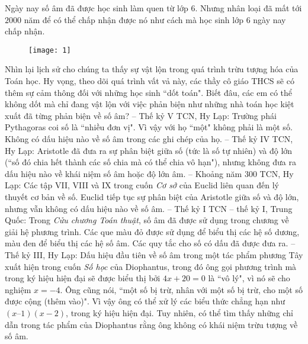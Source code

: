 \thispagestyle{quantoannone}
\pagestyle{quantoan}
\everymath{\color{quantoan}}
\graphicspath{{../quantoan/pic/}}
\begingroup
{}
\centering
\endgroup

\vspace*{160pt}

\begin{multicols}{2}	
	Ngày nay số âm đã được học sinh làm quen từ lớp $6$. Nhưng nhân loại đã mất tới $2000$ năm để có thể chấp nhận được nó như cách mà học sinh lớp $6$ ngày nay chấp nhận. 
	\begin{figure}[H]
		\vspace*{-5pt}
		\centering
		\captionsetup{labelformat= empty, justification=centering}
		\texttt{[image: 1]}
		\vspace*{-10pt}
	\end{figure}
	Nhìn lại lịch sử cho chúng ta thấy sự vật lộn trong quá trình trừu tượng hóa của Toán học. Hy vọng, theo dõi quá trình vất vả này, các thầy cô giáo THCS sẽ có thêm sự cảm thông đối với những học sinh ``dốt toán". Biết đâu, các em có thể không dốt mà chỉ đang vật lộn với việc phản biện như những nhà toán học kiệt xuất đã từng phản biện về số âm? 
	\vskip 0.1cm
	-- Thế kỷ V TCN, Hy Lạp: Trường phái Pythagoras coi số là ``nhiều đơn vị". Vì vậy với họ ``một" không phải là một số. Không có dấu hiệu nào về số âm trong các ghi chép của họ.
	\vskip 0.1cm
	-- Thế kỷ IV TCN, Hy Lạp: Aristotle đã đưa ra sự phân biệt giữa số (tức là số tự nhiên) và độ lớn (``số đó chia hết thành các số chia mà có thể chia vô hạn"), nhưng không đưa ra dấu hiệu nào về khái niệm số âm hoặc độ lớn âm.
	\vskip 0.1cm
	-- Khoảng năm $300$ TCN, Hy Lạp: Các tập VII, VIII và IX trong cuốn \textit{Cơ sở} của Euclid liên quan đến lý thuyết cơ bản về số. Euclid tiếp tục sự phân biệt của Aristotle giữa số và độ lớn, nhưng vẫn không có dấu hiệu nào về số âm.
	\vskip 0.1cm
	-- Thế kỷ I TCN -- thế kỷ I, Trung Quốc: Trong \textit{Cửu chương Toán thuật}, số âm đã được sử dụng trong chương về giải hệ phương trình. Các que màu đỏ được sử dụng để biểu thị các hệ số dương, màu đen để biểu thị các hệ số âm. Các quy tắc cho số có dấu đã được đưa ra.
	\vskip 0.1cm
	-- Thế kỷ III, Hy Lạp: Dấu hiệu đầu tiên về số âm trong một tác phẩm phương Tây xuất hiện trong cuốn \textit{Số học} của Diophantus, trong đó ông gọi phương trình mà trong ký hiệu hiện đại sẽ được biểu thị bởi $4x + 20 = 0$ là ``vô lý", vì nó sẽ cho nghiệm $x=-4$. Ông cũng nói, ``một số bị trừ, nhân với một số bị trừ, cho một số được cộng (thêm vào)". Vì vậy ông có thể xử lý các biểu thức chẳng hạn như $(x–1)(x-2)$, trong ký hiệu hiện đại. Tuy nhiên, có thể tìm thấy những chỉ dẫn trong tác phẩm của Diophantus rằng ông không có khái niệm trừu tượng về số âm.

\end{multicols}
